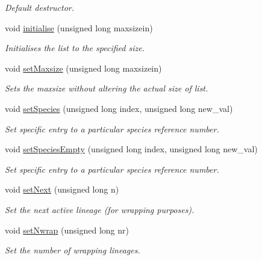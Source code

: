 \begin{DoxyCompactItemize}
\begin{DoxyCompactList}\small\item\em Default destructor. \end{DoxyCompactList}\item 
void \hyperlink{class_species_list_ab36fdc058217514e66e6152479dfab8d}{initialise} (unsigned long maxsizein)
\begin{DoxyCompactList}\small\item\em Initialises the list to the specified size. \end{DoxyCompactList}\item 
void \hyperlink{class_species_list_a8532bddc8397cf50531639c50cccbef3}{set\+Maxsize} (unsigned long maxsizein)
\begin{DoxyCompactList}\small\item\em Sets the maxsize without altering the actual size of list. \end{DoxyCompactList}\item 
void \hyperlink{class_species_list_a98f19fa65ed7cbe4536342ce2dff2b7b}{set\+Species} (unsigned long index, unsigned long new\+\_\+val)
\begin{DoxyCompactList}\small\item\em Set specific entry to a particular species reference number. \end{DoxyCompactList}\item 
void \hyperlink{class_species_list_a49854bb6392a5898fc277f4d2cf1f385}{set\+Species\+Empty} (unsigned long index, unsigned long new\+\_\+val)
\begin{DoxyCompactList}\small\item\em Set specific entry to a particular species reference number. \end{DoxyCompactList}\item 
void \hyperlink{class_species_list_a627f9d95948f4a2cb6cfb3d8b8f9f2ea}{set\+Next} (unsigned long n)
\begin{DoxyCompactList}\small\item\em Set the next active lineage (for wrapping purposes). \end{DoxyCompactList}\item 
void \hyperlink{class_species_list_ad3f8f91e3983b8829c0b405013b2709e}{set\+Nwrap} (unsigned long nr)
\begin{DoxyCompactList}\small\item\em Set the number of wrapping lineages. \end{DoxyCompactList}\item 

\end{DoxyCompactItemize}
